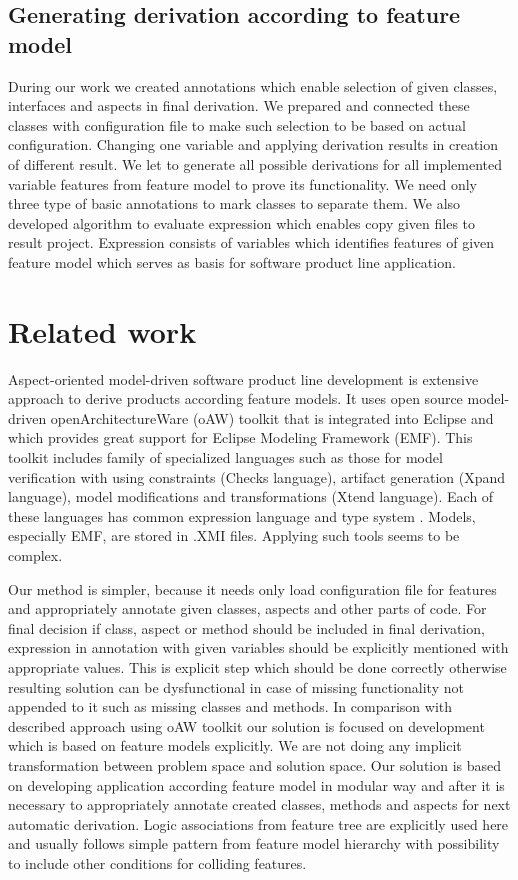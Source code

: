 \documentclass[11pt,english,a4paper,twoside]{article}
\begin{document}
\subsection{Generating derivation according to feature model} \label{gameDerivationBattleship}

During our work we created annotations which enable selection of given classes, interfaces and aspects in final derivation. We prepared and connected these classes with configuration file to make such selection to be based on actual configuration. Changing one variable and applying derivation results in creation of different result. We let to generate all possible derivations for all implemented variable features from feature model to prove its functionality. We need only three type of basic annotations to mark classes to separate them. We also developed algorithm to evaluate expression which enables copy given files to result project. Expression consists of variables which identifies features of given feature model which serves as basis for software product line application.    


\section{Related work} \label{recentWork}

Aspect-oriented model-driven software product line development is extensive approach to derive products according feature models. It uses open source model-driven openArchitectureWare (oAW) toolkit that is integrated into Eclipse and which provides great support for Eclipse Modeling Framework (EMF). This toolkit includes family of specialized languages such as those for model verification with using constraints (Checks language), artifact generation (Xpand language), model modifications and transformations (Xtend language). Each of these languages has common expression language and type system \cite{voelter_product_2007}. Models, especially EMF, are stored in .XMI files. Applying such tools seems to be complex. 

Our method is simpler, because it needs only load configuration file for features and appropriately annotate given classes, aspects and other parts of code. For final decision if class, aspect or method should be included in final derivation, expression in annotation with given variables should be explicitly mentioned with appropriate values. This is explicit step which should be done correctly otherwise resulting solution can be dysfunctional in case of missing functionality not appended to it such as missing classes and methods. In comparison with described approach using oAW toolkit our solution is focused on development which is based on feature models explicitly. We are not doing any implicit transformation between problem space and solution space. Our solution is based on developing application according feature model in modular way and after it is necessary to appropriately annotate created classes, methods and aspects for next automatic derivation. Logic associations from feature tree are explicitly used here and usually follows simple pattern from feature model hierarchy with possibility to include other conditions for colliding features.  
\end{document}
